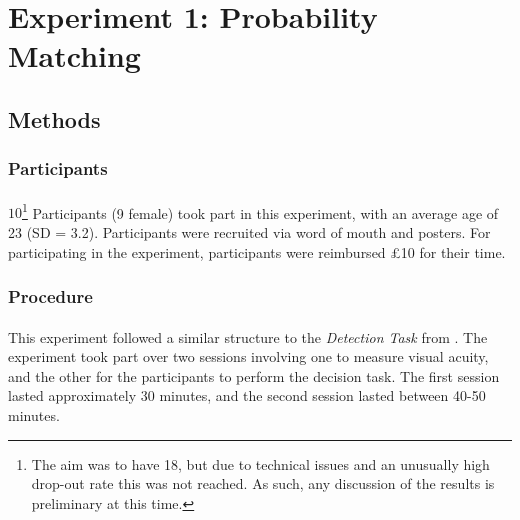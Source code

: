 \documentclass[12pt]{article}
\begin{document}


\section*{Experiment 1: Probability Matching}

\subsection*{Methods}
\subsubsection*{Participants}
\paragraph{} $10$\footnote{The aim was to have 18, but due to technical issues and an unusually high drop-out rate this was not reached. As such, any discussion of the results is preliminary at this time.} Participants (9 female) took part in this experiment, with an average age of 23 (SD = 3.2). Participants were recruited via word of mouth and posters. For participating in the experiment, participants were reimbursed \pounds10 for their time. 

\subsubsection*{Procedure}
\paragraph{} This experiment followed a similar structure to the \textit{Detection Task} from \cite{clarke2015failure}. The experiment took part over two sessions involving one to measure visual acuity, and the other for the participants to perform the decision task. The first session lasted approximately 30 minutes, and the second session lasted between 40-50 minutes.
\end{document}
